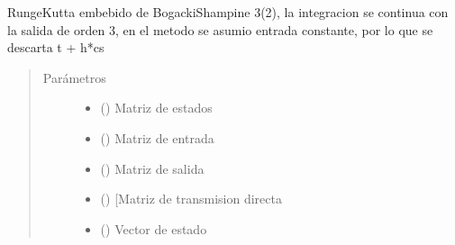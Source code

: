 \documentclass[letterpaper,10pt,spanish]{sphinxmanual}
\begin{document}
\begin{fulllineitems}
\label{\detokenize{codigos/rk_generator:rk_generator.bogacki_shampine23}}
Runge\sphinxhyphen{}Kutta embebido de Bogacki\sphinxhyphen{}Shampine 3(2), la integracion se continua con la salida de orden 3, en el metodo se asumio entrada constante, por lo que se descarta t + h*cs
\begin{quote}\begin{description}
\item[{Parámetros}] \leavevmode\begin{itemize}
\item {} 
 (\sphinxstyleliteralemphasis{\sphinxupquote{, }}\sphinxstyleliteralemphasis{\sphinxupquote{, }}) \textendash{} Matriz de estados

\item {} 
 (\sphinxstyleliteralemphasis{\sphinxupquote{, }}\sphinxstyleliteralemphasis{\sphinxupquote{, }}) \textendash{} Matriz de entrada

\item {} 
 (\sphinxstyleliteralemphasis{\sphinxupquote{, }}\sphinxstyleliteralemphasis{\sphinxupquote{, }}) \textendash{} Matriz de salida

\item {} 
 (\sphinxstyleliteralemphasis{\sphinxupquote{, }}\sphinxstyleliteralemphasis{\sphinxupquote{, }}) \textendash{} {[}Matriz de transmision directa

\item {} 
 (\sphinxstyleliteralemphasis{\sphinxupquote{, }}\sphinxstyleliteralemphasis{\sphinxupquote{, }}) \textendash{} Vector de estado


\end{itemize}
\end{description}
\end{quote}
\end{fulllineitems}
\end{document}
